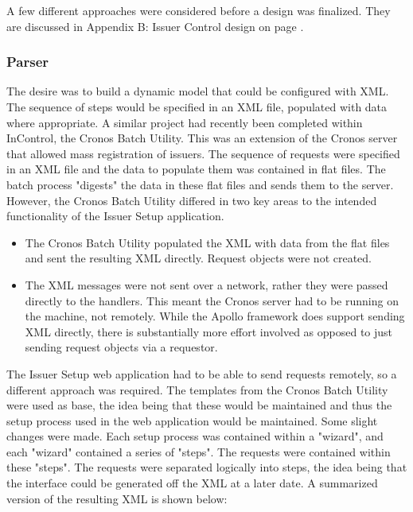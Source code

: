 \documentclass[a4paper, 11pt, titlepage]{article}
\begin{document}
A few different approaches were considered before a design was finalized. They are discussed in Appendix B: Issuer Control design on page \pageref{issuer_control}.
 
\subsubsection{Parser} 
The desire was to build a dynamic model that could be configured with XML. The sequence of steps would be specified in an XML file, populated with data where appropriate. A similar project had recently been completed within InControl, the Cronos Batch Utility. This was an extension of the Cronos server that allowed mass registration of issuers. The sequence of requests were specified in an XML file and the data to populate them was contained in flat files. The batch process "digests" the data in these flat files and sends them to the server. However, the Cronos Batch Utility differed in two key areas to the intended functionality of the Issuer Setup application. 
\begin{itemize} 
\item The Cronos Batch Utility populated the XML with data from the flat files and sent the resulting XML directly. Request objects were not created. 
\item The XML messages were not sent over a network, rather they were passed directly to the handlers. This meant the Cronos server had to be running on the machine, not remotely. While the Apollo framework does support sending XML directly, there is substantially more effort involved as opposed to just sending request objects via a requestor.  
\end{itemize} 
The Issuer Setup web application had to be able to send requests remotely, so a different approach was required. The templates from the Cronos Batch Utility were used as base, the idea being that these would be maintained and thus the setup process used in the web application would be maintained. Some slight changes were made. Each setup process was contained within a "wizard", and each "wizard" contained a series of "steps". The requests were contained within these "steps". The requests were separated logically into steps, the idea being that the interface could be generated off the XML at a later date. A summarized version of the resulting XML is shown below: 
\end{document}
